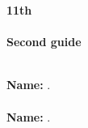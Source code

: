 \begin{center} \textbf
{
    \Large 11th\\\vspace{3mm}\\ Second guide
}
\end{center}

\vspace{3mm}\\
\textbf{Name:} \hrulefill.\\
\vspace{4mm}\\
\textbf{Name:} \hrulefill.\\